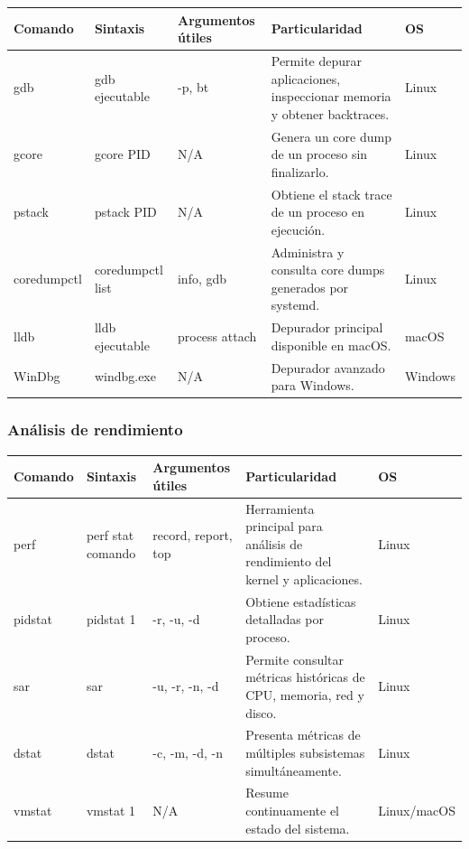 \documentclass[a4paper,10pt]{article}
\begin{document}
\begin{longtable}{|p{2.8cm}|p{3.3cm}|p{4cm}|p{5.3cm}|p{1.5cm}|}

\hline
Comando &
Sintaxis &
Argumentos útiles &
Particularidad &
OS
\\
\hline
\endhead

gdb &
gdb ejecutable &
-p, bt &
Permite depurar aplicaciones, inspeccionar memoria y obtener backtraces.
&
Linux
\\
\hline

gcore &
gcore PID &
N/A &
Genera un core dump de un proceso sin finalizarlo.
&
Linux
\\
\hline

pstack &
pstack PID &
N/A &
Obtiene el stack trace de un proceso en ejecución.
&
Linux
\\
\hline

coredumpctl &
coredumpctl list &
info, gdb &
Administra y consulta core dumps generados por systemd.
&
Linux
\\
\hline

lldb &
lldb ejecutable &
process attach &
Depurador principal disponible en macOS.
&
macOS
\\
\hline

WinDbg &
windbg.exe &
N/A &
Depurador avanzado para Windows.
&
Windows
\\
\hline

\end{longtable}




\subsubsection{Análisis de rendimiento}

\begin{longtable}{|p{2.8cm}|p{3.3cm}|p{4cm}|p{5.3cm}|p{1.5cm}|}

\hline
Comando &
Sintaxis &
Argumentos útiles &
Particularidad &
OS
\\
\hline
\endhead

perf &
perf stat comando &
record, report, top &
Herramienta principal para análisis de rendimiento del kernel y aplicaciones.
&
Linux
\\
\hline

pidstat &
pidstat 1 &
-r, -u, -d &
Obtiene estadísticas detalladas por proceso.
&
Linux
\\
\hline

sar &
sar &
-u, -r, -n, -d &
Permite consultar métricas históricas de CPU, memoria, red y disco.
&
Linux
\\
\hline

dstat &
dstat &
-c, -m, -d, -n &
Presenta métricas de múltiples subsistemas simultáneamente.
&
Linux
\\
\hline

vmstat &
vmstat 1 &
N/A &
Resume continuamente el estado del sistema.
&
Linux/macOS
\\
\hline

\end{longtable}
\end{document}
